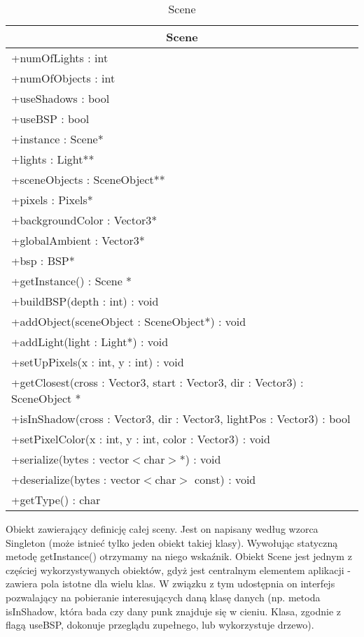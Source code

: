 \begin{longtable}{|p{16cm}|}
    \caption{Scene} \label{tab:Scene} \\ \hline
    \multicolumn{1}{|c|}{Scene} \\ \hline
    +numOfLights : int \\
    +numOfObjects : int \\
    +useShadows : bool \\
    +useBSP : bool \\
    +instance : Scene* \\
    +lights : Light** \\
    +sceneObjects : SceneObject** \\
    +pixels : Pixels* \\
    +backgroundColor : Vector3* \\
    +globalAmbient : Vector3* \\
    +bsp : BSP* \\
    \hline
	+getInstance() : Scene * \\
	+buildBSP(depth : int) : void \\
	+addObject(sceneObject : SceneObject*) : void \\
	+addLight(light : Light*) : void \\
	+setUpPixels(x : int, y : int) : void \\
	+getClosest(cross : Vector3, start : Vector3, dir : Vector3) : SceneObject * \\
	+isInShadow(cross : Vector3, dir : Vector3, lightPos : Vector3) : bool \\
	+setPixelColor(x : int, y : int, color : Vector3) : void \\
	+serialize(bytes : vector$<$char$>$*) : void \\
	+deserialize(bytes : vector$<$char$>$ const) : void \\
	+getType() : char \\
	\hline
\end{longtable}

Obiekt zawierający definicję całej sceny. Jest on napisany według wzorca Singleton (może istnieć tylko jeden obiekt takiej klasy). Wywołując statyczną metodę getInstance() otrzymamy na niego wskaźnik. Obiekt Scene jest jednym z częściej wykorzystywanych obiektów, gdyż jest centralnym elementem aplikacji - zawiera pola istotne dla wielu klas. W związku z tym udostępnia on interfejs pozwalający na pobieranie interesujących daną klasę danych (np. metoda isInShadow, która bada czy dany punk znajduje się w cieniu. Klasa, zgodnie z flagą useBSP, dokonuje przeglądu zupełnego, lub wykorzystuje drzewo).

